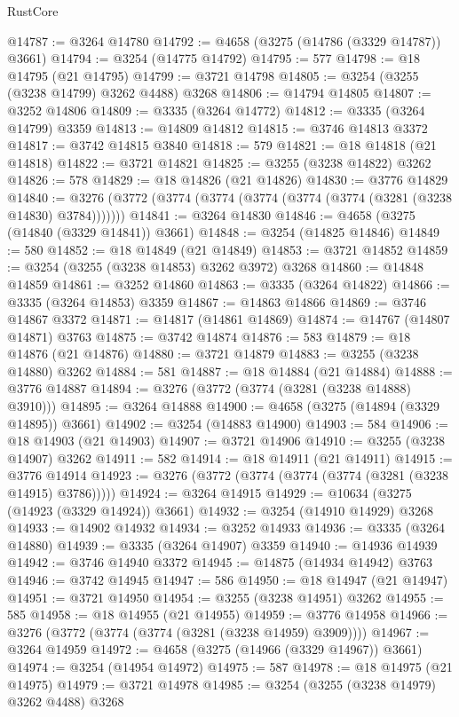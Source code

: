 \begin{lexlean}{RustCore}
\begin{coremodule}
@14787 := @3264 @14780
@14792 := @4658 (@3275 (@14786 (@3329 @14787)) @3661)
@14794 := @3254 (@14775 @14792)
@14795 := 577
@14798 := @18 @14795 (@21 @14795)
@14799 := @3721 @14798
@14805 := @3254 (@3255 (@3238 @14799) @3262 @4488) @3268
@14806 := @14794 @14805
@14807 := @3252 @14806
@14809 := @3335 (@3264 @14772)
@14812 := @3335 (@3264 @14799) @3359
@14813 := @14809 @14812
@14815 := @3746 @14813 @3372
@14817 := @3742 @14815 @3840
@14818 := 579
@14821 := @18 @14818 (@21 @14818)
@14822 := @3721 @14821
@14825 := @3255 (@3238 @14822) @3262
@14826 := 578
@14829 := @18 @14826 (@21 @14826)
@14830 := @3776 @14829
@14840 := @3276 (@3772 (@3774 (@3774 (@3774 (@3774 (@3774 (@3281 (@3238 @14830) @3784)))))))
@14841 := @3264 @14830
@14846 := @4658 (@3275 (@14840 (@3329 @14841)) @3661)
@14848 := @3254 (@14825 @14846)
@14849 := 580
@14852 := @18 @14849 (@21 @14849)
@14853 := @3721 @14852
@14859 := @3254 (@3255 (@3238 @14853) @3262 @3972) @3268
@14860 := @14848 @14859
@14861 := @3252 @14860
@14863 := @3335 (@3264 @14822)
@14866 := @3335 (@3264 @14853) @3359
@14867 := @14863 @14866
@14869 := @3746 @14867 @3372
@14871 := @14817 (@14861 @14869)
@14874 := @14767 (@14807 @14871) @3763
@14875 := @3742 @14874
@14876 := 583
@14879 := @18 @14876 (@21 @14876)
@14880 := @3721 @14879
@14883 := @3255 (@3238 @14880) @3262
@14884 := 581
@14887 := @18 @14884 (@21 @14884)
@14888 := @3776 @14887
@14894 := @3276 (@3772 (@3774 (@3281 (@3238 @14888) @3910)))
@14895 := @3264 @14888
@14900 := @4658 (@3275 (@14894 (@3329 @14895)) @3661)
@14902 := @3254 (@14883 @14900)
@14903 := 584
@14906 := @18 @14903 (@21 @14903)
@14907 := @3721 @14906
@14910 := @3255 (@3238 @14907) @3262
@14911 := 582
@14914 := @18 @14911 (@21 @14911)
@14915 := @3776 @14914
@14923 := @3276 (@3772 (@3774 (@3774 (@3774 (@3281 (@3238 @14915) @3786)))))
@14924 := @3264 @14915
@14929 := @10634 (@3275 (@14923 (@3329 @14924)) @3661)
@14932 := @3254 (@14910 @14929) @3268
@14933 := @14902 @14932
@14934 := @3252 @14933
@14936 := @3335 (@3264 @14880)
@14939 := @3335 (@3264 @14907) @3359
@14940 := @14936 @14939
@14942 := @3746 @14940 @3372
@14945 := @14875 (@14934 @14942) @3763
@14946 := @3742 @14945
@14947 := 586
@14950 := @18 @14947 (@21 @14947)
@14951 := @3721 @14950
@14954 := @3255 (@3238 @14951) @3262
@14955 := 585
@14958 := @18 @14955 (@21 @14955)
@14959 := @3776 @14958
@14966 := @3276 (@3772 (@3774 (@3774 (@3281 (@3238 @14959) @3909))))
@14967 := @3264 @14959
@14972 := @4658 (@3275 (@14966 (@3329 @14967)) @3661)
@14974 := @3254 (@14954 @14972)
@14975 := 587
@14978 := @18 @14975 (@21 @14975)
@14979 := @3721 @14978
@14985 := @3254 (@3255 (@3238 @14979) @3262 @4488) @3268

\end{coremodule}
\end{lexlean}
